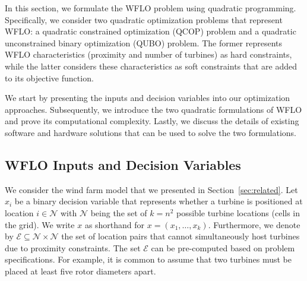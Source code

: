 \documentclass[preprint,12pt]{elsarticle}
\begin{document}
In this section,
we formulate the WFLO problem
using quadratic programming. Specifically, we consider two
quadratic optimization problems that represent WFLO: a
quadratic constrained optimization (QCOP) problem and 
a quadratic unconstrained binary optimization (QUBO) problem. 
The former represents WFLO characteristics (proximity and number of turbines)
as hard constraints, while the latter considers these characteristics as soft constraints that are added to its objective function.

We start by presenting the inputs and decision variables into our optimization approaches.
Subsequently, we introduce the two quadratic formulations of WFLO and 
prove its computational complexity. Lastly, we discuss the details of existing
software and hardware solutions that can be used to solve the two formulations. 

\subsection{WFLO Inputs and Decision Variables} We consider the wind farm model that we presented in Section~\ref{sec:related}. 
Let $x_i$ be a binary decision variable that represents whether a 
turbine is positioned at location 
$i \in \mathcal{N}$ with $\mathcal{N}$ being the set 
of $k = n^2$ possible turbine locations (cells in the grid). We 
write $x$ as shorthand for $x = (x_1,\ldots, x_k)$. Furthermore,
we denote by $\mathcal{E} \subseteq \mathcal{N}\times \mathcal{N}$
the set of location pairs that cannot simultaneously host turbines 
due to proximity constraints. The set $\mathcal{E}$ can be pre-computed 
based on problem specifications. For example,
it is common to assume that two turbines must be placed at least five rotor diameters apart. 
\end{document}
